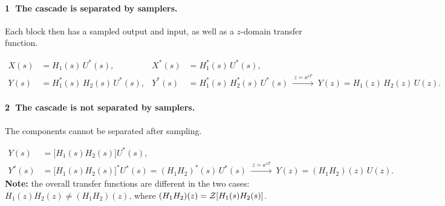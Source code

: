 \paragraph{\textcircled{1} The cascade is separated by samplers.} Each block then has a sampled output and
input, as well as a $z$-domain transfer function.
\begin{center}
\resizebox{0.9\linewidth}{!}{\figCascadeS}
\end{center}
\begin{align*}
  X(s)&=H_1(s)\,U^{*}(s), & X^{*}(s)&=H_1^{*}(s)\,U^{*}(s),\\
  Y(s)&=H_1^{*}(s)\,H_2(s)\,U^{*}(s), & Y^{*}(s)&=H_1^{*}(s)\,H_2^{*}(s)\,U^{*}(s)
  \ \xrightarrow{\ z=\ee^{sT}\ }\ Y(z)=H_1(z)\,H_2(z)\,U(z).
\end{align*}

\paragraph{\textcircled{2} The cascade is not separated by samplers.} The components cannot be separated
after sampling.
\begin{center}
\resizebox{0.78\linewidth}{!}{\figCascadeNS}
\end{center}
\begin{align*}
  Y(s)&=\bigl[H_1(s)H_2(s)\bigr]U^{*}(s),\\
  Y^{*}(s)&=\bigl[H_1(s)H_2(s)\bigr]^{*}U^{*}(s)=(H_1H_2)^{*}(s)\,U^{*}(s)
  \ \xrightarrow{\ z=\ee^{sT}\ }\ Y(z)=(H_1H_2)(z)\,U(z).
\end{align*}
\textbf{Note:} the overall transfer functions are different in the two cases:
$H_1(z)H_2(z)\ne(H_1H_2)(z)$, where $(H_1H_2)(z)=\mathcal{Z}\!\left[H_1(s)H_2(s)\right]$.

